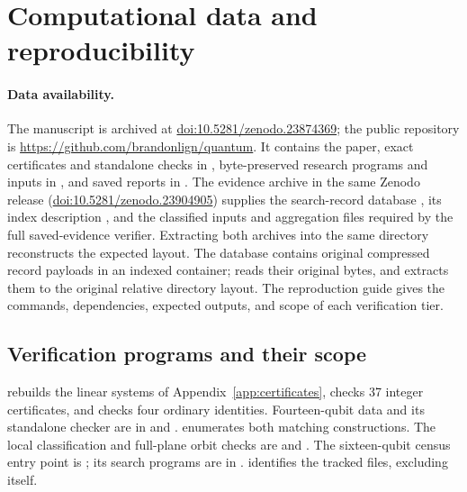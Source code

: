 \section{Computational data and reproducibility}\label{app:evidence}

\paragraph{Data availability.}
The manuscript is archived at
\href{https://doi.org/10.5281/zenodo.23874369}{doi:10.5281/zenodo.23874369};
the public repository is \url{https://github.com/brandonlign/quantum}.
It contains the paper, exact certificates and standalone checks in
, byte-preserved research programs and inputs in
, and saved reports in .
The evidence archive in the same Zenodo release
(\href{https://doi.org/10.5281/zenodo.23904905}{doi:10.5281/zenodo.23904905})
supplies the search-record database
, its index description
, and the classified
inputs and aggregation files required by the full saved-evidence verifier.
Extracting both archives into the same directory reconstructs the expected
layout. The database contains original compressed record payloads in an
indexed container;  reads their original
bytes, and  extracts them to the
original relative directory layout. The reproduction guide
 gives the commands, dependencies, expected outputs,
and scope of each verification tier.

\subsection{Verification programs and their scope}

 rebuilds the linear systems
of Appendix~\ref{app:certificates}, checks 37 integer certificates, and
checks four ordinary identities. Fourteen-qubit data and its standalone
checker are in  and
.
 enumerates both matching
constructions. The local classification and full-plane orbit checks are
 and
.
The sixteen-qubit census entry point is
; its search
programs are in .
 identifies the tracked files, excluding itself.

